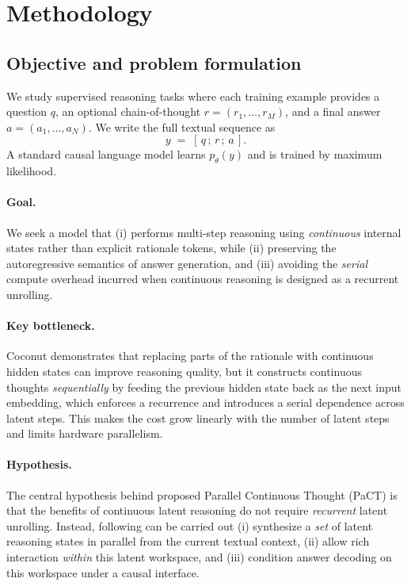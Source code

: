 \section{Methodology}
\label{sec:method}

\subsection{Objective and problem formulation}
\label{sec:objective}

We study supervised reasoning tasks where each training example provides a question $q$,
an optional chain-of-thought $r = (r_1,\dots,r_M)$, and a final answer
$a = (a_1,\dots,a_N)$. We write the full textual sequence as
\[
y \;=\; [\,q \,;\, r \,;\, a\,].
\]
A standard causal language model learns $p_\theta(y)$ and is trained by maximum likelihood.

\paragraph{Goal.}
We seek a model that (i) performs multi-step reasoning using \emph{continuous} internal states
rather than explicit rationale tokens, while (ii) preserving the autoregressive semantics of answer
generation, and (iii) avoiding the \emph{serial} compute overhead incurred when continuous reasoning
is designed as a recurrent unrolling.

\paragraph{Key bottleneck.}
Coconut \cite{hao2024training} demonstrates that replacing parts of the rationale with continuous hidden states can improve
reasoning quality, but it constructs continuous thoughts \emph{sequentially} by feeding the previous
hidden state back as the next input embedding, which enforces a recurrence and introduces a serial
dependence across latent steps. This makes the cost grow linearly with the number of latent steps and
limits hardware parallelism. 

\paragraph{Hypothesis.}
The central hypothesis behind proposed {Parallel Continuous Thought (PaCT)} is that the benefits of
continuous latent reasoning do not require \emph{recurrent} latent unrolling. Instead, following can be carried out 
(i) synthesize a \emph{set} of latent reasoning states in parallel from the current textual context,
(ii) allow rich interaction \emph{within} this latent workspace, and (iii) condition answer decoding on
this workspace under a causal interface. 


